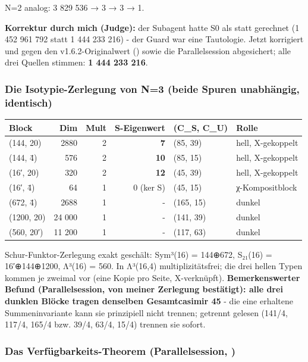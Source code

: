 N=2 analog: 3 829 536 → 3 → 3 → 1.

\textbf{Korrektur durch mich (Judge):} der Subagent hatte S0 als
 statt  gerechnet (1 452 961 792 statt 1
444 233 216) - der Guard war eine Tautologie. Jetzt korrigiert und gegen
den v1.6.2-Originalwert () sowie die
Parallelsession abgesichert; alle drei Quellen stimmen: \textbf{1 444
233 216}.

\subsubsection{Die Isotypie-Zerlegung von N=3 (beide Spuren unabhängig,
identisch)}\label{die-isotypie-zerlegung-von-n3-beide-spuren-unabhuxe4ngig-identisch}

{\def\LTcaptype{none} %
\begin{longtable}[]{@{}lrrrll@{}}
\toprule\noalign{}
Block & Dim & Mult & S-Eigenwert & (C\_S, C\_U) & Rolle \\
\midrule\noalign{}
\endhead
\bottomrule\noalign{}
\endlastfoot
(144, 20) & 2880 & 2 & \textbf{7} & (85, 39) & hell, X-gekoppelt \\
(144, 4̄) & 576 & 2 & \textbf{10} & (85, 15) & hell, X-gekoppelt \\
(16′, 20) & 320 & 2 & \textbf{12} & (45, 39) & hell, X-gekoppelt \\
(16′, 4̄) & 64 & 1 & 0 (ker S) & (45, 15) & χ-Kompositblock \\
(672, 4̄) & 2688 & 1 & - & (165, 15) & dunkel \\
(1200, 20) & 24 000 & 1 & - & (141, 39) & dunkel \\
(560, 20′) & 11 200 & 1 & - & (117, 63) & dunkel \\
\end{longtable}
}

Schur-Funktor-Zerlegung exakt geschält: Sym³(16) = 144⊕\allowbreak{}672, S₂₁(16) =
16′⊕\allowbreak{}144⊕\allowbreak{}1200, Λ³(16) = 560. In Λ³(16,4) multiplizitätsfrei; die drei
hellen Typen kommen je zweimal vor (eine Kopie pro Seite, X-verknüpft).
\textbf{Bemerkenswerter Befund (Parallelsession, von meiner Zerlegung
bestätigt): alle drei dunklen Blöcke tragen denselben Gesamtcasimir 45}
- die eine erhaltene Summeninvariante kann sie prinzipiell nicht
trennen; getrennt gelesen (141/4, 117/4, 165/4 bzw. 39/4, 63/4, 15/4)
trennen sie sofort.

\subsubsection{\texorpdfstring{Das Verfügbarkeits-Theorem
(Parallelsession,
)}{Das Verfügbarkeits-Theorem (Parallelsession, )}}\label{das-verfuxfcgbarkeits-theorem-parallelsession-symmetry_availability.py}

